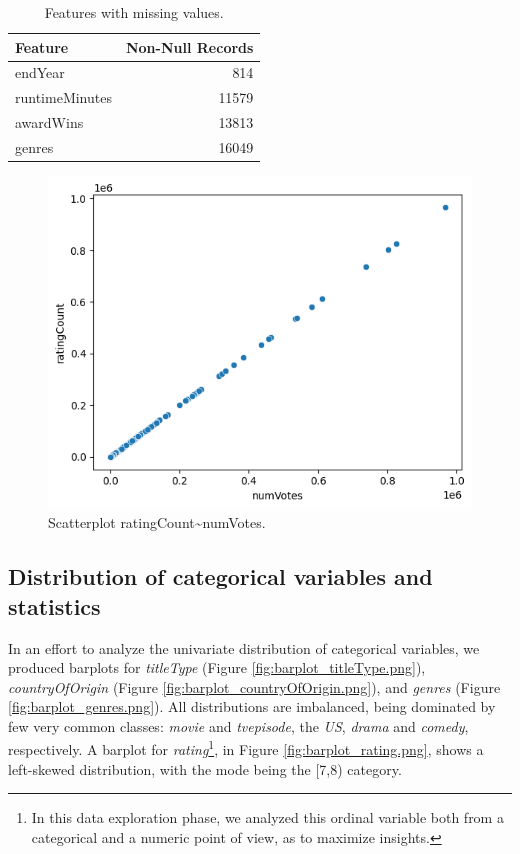 \begin{table}[h]
    \centering
    \caption{Features with missing values.}
    \begin{tabular}{|l|r|}
        \hline
        \textbf{Feature} & \textbf{Non-Null Records} \\
        \hline
        endYear & 814 \\
        runtimeMinutes & 11579 \\
        awardWins & 13813 \\
        genres & 16049 \\
        \hline
    \end{tabular}
    \label{tab:feats_nan}
\end{table}

\begin{figure}
    \includegraphics[width=\columnwidth]{../results/images/scatter_numVotes_ratingCount.png}
    \caption{Scatterplot ratingCount\textasciitilde numVotes.}
    \label{fig:scatterplot_numVotes_ratingCount}
\end{figure}

\subsection{Distribution of categorical variables and statistics}
In an effort to analyze the univariate distribution of categorical variables, we produced barplots for \textit{titleType} (Figure \ref{fig:barplot_titleType.png}), \textit{countryOfOrigin} (Figure \ref{fig:barplot_countryOfOrigin.png}), and \textit{genres} (Figure \ref{fig:barplot_genres.png}). All distributions are imbalanced, being dominated by few very common classes: \textit{movie} and \textit{tvepisode}, the \textit{US}, \textit{drama} and \textit{comedy}, respectively. A barplot for \textit{rating}\footnote{In this data exploration phase, we analyzed this ordinal variable both from a categorical and a numeric point of view, as to maximize insights.}, in Figure \ref{fig:barplot_rating.png}, shows a left-skewed distribution, with the mode being the [7,8) category.

